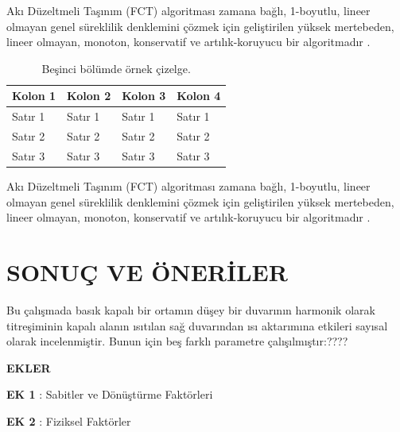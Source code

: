 \documentclass[a4paper, 12pt, oneside]{Etuthesis}
\begin{document}
{Akı Düzeltmeli Taşınım (FCT) algoritması zamana bağlı, 1-boyutlu, lineer olmayan genel süreklilik denklemini çözmek için geliştirilen yüksek mertebeden, lineer olmayan, monoton, konservatif ve artılık-koruyucu bir algoritmadır . 

\begin{table}
\centering
\begin{tabular}{|l|l|l|l|}
 \hline
 Kolon 1 & Kolon 2 & Kolon 3 & Kolon 4 \\ 
 \hline
 Satır 1 & Satır 1 & Satır 1 & Satır 1 \\ 
 \hline
 Satır 2 & Satır 2 & Satır 2 & Satır 2 \\
 \hline
 Satır 3 & Satır 3 & Satır 3 & Satır 3 \\
 \hline
\end{tabular}
\caption{Beşinci bölümde örnek çizelge.}
\end{table}

Akı Düzeltmeli Taşınım (FCT) algoritması zamana bağlı, 1-boyutlu, lineer olmayan genel süreklilik denklemini çözmek için geliştirilen yüksek mertebeden, lineer olmayan, monoton, konservatif ve artılık-koruyucu bir algoritmadır . 

\section{SONUÇ VE ÖNERİLER}

Bu çalışmada basık kapalı bir ortamın düşey bir duvarının harmonik olarak titreşiminin kapalı alanın ısıtılan sağ duvarından ısı aktarımına etkileri sayısal olarak incelenmiştir. Bunun için beş farklı parametre çalışılmıştır:???? 

\vfill
\newpage

%
%




\vfill
\newpage

}

\textbf{EKLER}
\par\bigskip
\textbf{EK 1} : Sabitler ve Dönüştürme Faktörleri\par
\textbf{EK 2} : Fiziksel Faktörler\par
\vfill
\newpage
\end{document}
